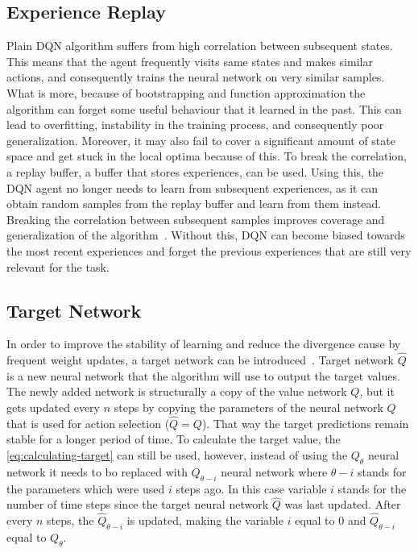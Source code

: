 \documentclass{article}
\begin{document}
\subsection{Experience Replay}
\label{subsec:experience-replay}

Plain DQN algorithm suffers from high correlation between subsequent states.
This means that the agent frequently visits same states and makes similar actions,
and consequently trains the neural network on very similar samples.
What is more, because of bootstrapping and function approximation the algorithm can forget some useful behaviour that it learned in the past.
This can lead to overfitting, instability in the training process, and consequently poor generalization.
Moreover, it may also fail to cover a significant amount of state space and get stuck
in the local optima because of this.
To break the correlation, a replay buffer, a buffer that stores experiences, can be used.
Using this, the DQN agent no longer needs to learn from subsequent experiences, as it can obtain random samples
from the replay buffer and learn from them instead.
Breaking the correlation between subsequent samples improves coverage and generalization of the algorithm~\cite{DBLP:books/sp/Plaat22}.
Without this, DQN can become biased towards the most recent experiences and forget the previous experiences
that are still very relevant for the task.

\subsection{Target Network}
\label{subsec:target-network}

In order to improve the stability of learning and reduce the divergence cause by frequent weight updates,
a target network can be introduced~\cite{DBLP:books/sp/Plaat22}.
Target network $\hat Q$ is a new neural network that the algorithm will use to output the target values.
The newly added network is structurally a copy of the value network $Q$, but it gets updated every $n$ steps
by copying the parameters of the neural network $Q$ that is used for action selection ($\hat Q = Q$).
That way the target predictions remain stable for a longer period of time.
To calculate the target value, the \autoref{eq:calculating-target} can still be used, however, instead of using the $Q_\theta$
neural network it needs to bo replaced with $Q_{\theta - i}$ neural network where $\theta - i$ stands for the parameters
which were used $i$ steps ago.
In this case variable $i$ stands for the number of time steps since the target neural network $\hat Q$ was last updated.
After every $n$ steps, the $\hat Q_{\theta - i}$ is updated, making the variable $i$ equal to 0 and $\hat Q_{\theta - i}$
equal to $Q_\theta$.
\end{document}

